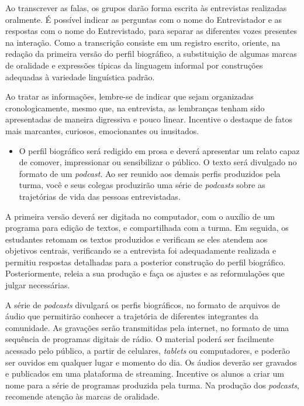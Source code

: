 \documentclass[11pt]{extarticle}
\begin{document}
Ao transcrever as falas, os grupos darão forma escrita às entrevistas
realizadas oralmente. É possível indicar as perguntas com o nome do
Entrevistador e as respostas com o nome do Entrevistado, para separar as
diferentes vozes presentes na interação. Como a transcrição consiste em
um registro escrito, oriente, na redação da primeira versão do perfil
biográfico, a substituição de algumas marcas de oralidade e expressões
típicas da linguagem informal por construções adequadas à variedade
linguística padrão.

Ao tratar as informações, lembre-se de indicar que sejam organizadas
cronologicamente, mesmo que, na entrevista, as lembranças tenham sido
apresentadas de maneira digressiva e pouco linear. Incentive o destaque
de fatos mais marcantes, curiosos, emocionantes ou inusitados.

\begin{itemize}
\item
  O perfil biográfico será redigido em prosa e deverá apresentar um
  relato capaz de comover, impressionar ou sensibilizar o público. O
  texto será divulgado no formato de um \emph{podcast}. Ao ser reunido
  aos demais perfis produzidos pela turma, você e seus colegas
  produzirão uma série de \emph{podcasts} sobre as trajetórias de vida
  das pessoas entrevistadas.
\end{itemize}

A primeira versão deverá ser digitada no computador, com o auxílio de um
programa para edição de textos, e compartilhada com a turma. Em seguida,
os estudantes retomam os textos produzidos e verificam se eles atendem
aos objetivos centrais, verificando se a entrevista foi adequadamente
realizada e permitiu respostas detalhadas para a posterior construção do
perfil biográfico. Posteriormente, releia a sua produção e faça os
ajustes e as reformulações que julgar necessárias.

A série de \emph{podcasts} divulgará os perfis biográficos, no formato
de arquivos de áudio que permitirão conhecer a trajetória de diferentes
integrantes da comunidade. As gravações serão transmitidas pela
internet, no formato de uma sequência de programas digitais de rádio. O
material poderá ser facilmente acessado pelo público, a partir de
celulares, \emph{tablets} ou computadores, e poderão ser ouvidos em
qualquer lugar e momento do dia. Os áudios deverão ser gravados e
publicados em uma plataforma de streaming. Incentive os alunos a criar
um nome para a série de programas produzida pela turma. Na produção dos
\emph{podcasts}, recomende atenção às marcas de oralidade.
\end{document}
